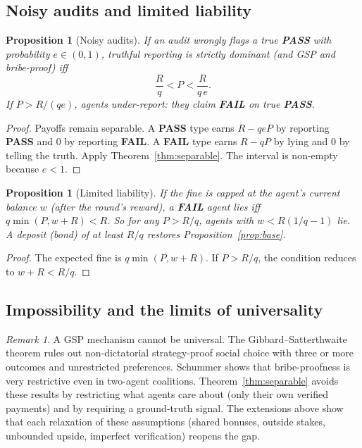 \documentclass[11pt]{article}
\newtheorem{proposition}[theorem]{Proposition}
\theoremstyle{definition}
\theoremstyle{remark}
\newtheorem{remark}[theorem]{Remark}
\newcommand{\PASS}{\textbf{PASS}}
\newcommand{\FAIL}{\textbf{FAIL}}
\newcommand{\1}{\mathbf{1}}
\begin{document}
\subsection{Noisy audits and limited liability}

\begin{proposition}[Noisy audits]\label{prop:noisy}
If an audit wrongly flags a true \PASS{} with probability $e\in(0,1)$, truthful reporting
is strictly dominant (and GSP and bribe-proof) iff
\[
\frac{R}{q}<P<\frac{R}{q\,e}.
\]
If $P>R/(qe)$, agents under-report: they claim \FAIL{} on true \PASS{}.
\end{proposition}

\begin{proof}
Payoffs remain separable. A \PASS{} type earns $R-qeP$ by reporting \PASS{} and $0$ by
reporting \FAIL{}. A \FAIL{} type earns $R-qP$ by lying and $0$ by telling the truth.
Apply Theorem~\ref{thm:separable}. The interval is non-empty because $e<1$.
\end{proof}

\begin{proposition}[Limited liability]\label{prop:liability}
If the fine is capped at the agent's current balance $w$ (after the round's reward), a
\FAIL{} agent lies iff $q\min(P,w+R)<R$. So for any $P>R/q$, agents with
$w<R(1/q-1)$ lie. A deposit (bond) of at least $R/q$ restores Proposition~\ref{prop:base}.
\end{proposition}

\begin{proof}
The expected fine is $q\min(P,w+R)$. If $P>R/q$, the condition reduces to $w+R<R/q$.
\end{proof}

\subsection{Impossibility and the limits of universality}

\begin{remark}
A GSP mechanism cannot be universal. The Gibbard--Satterthwaite theorem
\cite{gibbard1973,satterthwaite1975} rules out non-dictatorial strategy-proof social
choice with three or more outcomes and unrestricted preferences. Schummer
\cite{schummer2000} shows that bribe-proofness is very restrictive even in two-agent
coalitions. Theorem~\ref{thm:separable} avoids these results by restricting what agents
care about (only their own verified payments) and by requiring a ground-truth signal.
The extensions above show that each relaxation of these assumptions (shared bonuses,
outside stakes, unbounded upside, imperfect verification) reopens the gap.
\end{remark}
\end{document}
